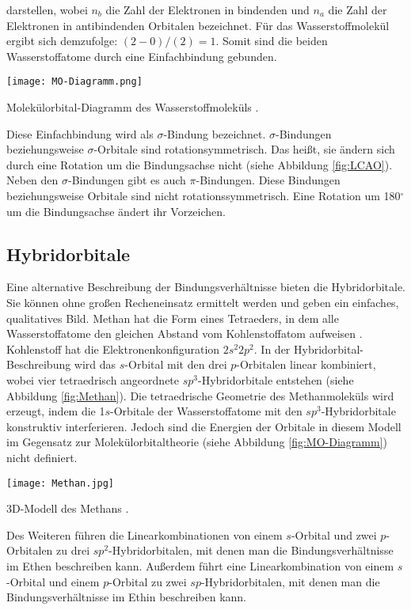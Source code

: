 darstellen, wobei $n_b$ die Zahl der Elektronen in bindenden und $n_a$ die Zahl der Elektronen in antibindenden Orbitalen bezeichnet. Für das Wasserstoffmolekül ergibt sich demzufolge: $(2-0)/(2) = 1$. Somit sind die beiden Wasserstoffatome durch eine Einfachbindung gebunden.

 \begin{dsafigure}
  \texttt{[image: MO-Diagramm.png]}
  \caption{Molekülorbital-Diagramm des Wasserstoffmoleküls \cite{WasserstoffMO}.}
  \label{fig:MO-Diagramm}
\end{dsafigure}

Diese Einfachbindung wird als $\sigma$-Bindung bezeichnet. $\sigma$-Bindungen beziehungsweise $\sigma$-Orbitale sind rotationsymmetrisch. Das heißt, sie ändern sich durch eine Rotation um die Bindungsachse nicht (siehe Abbildung \ref{fig:LCAO}). Neben den $\sigma$-Bindungen gibt es auch $\pi$-Bindungen. Diese Bindungen beziehungsweise Orbitale sind nicht rotationssymmetrisch. Eine Rotation um 180$^\circ$ um die Bindungsachse ändert ihr Vorzeichen.

\subsection{Hybridorbitale}

Eine alternative Beschreibung der Bindungsverhältnisse bieten die Hybridorbitale. Sie können ohne großen Recheneinsatz ermittelt werden und geben ein einfaches, qualitatives Bild.
Methan hat die Form eines Tetraeders, in dem alle Wasserstoffatome den gleichen Abstand vom Kohlenstoffatom aufweisen \cite{Riedel04}. Kohlenstoff hat die Elektronenkonfiguration $2s^2 2p^2$. In der Hybridorbital-Beschreibung wird das $s$-Orbital mit den drei $p$-Orbitalen linear kombiniert, wobei vier tetraedrisch angeordnete $sp^3$-Hybridorbitale entstehen (siehe Abbildung \ref{fig:Methan}).
Die tetraedrische Geometrie des Methanmoleküls wird erzeugt, indem die 1$s$-Orbitale der Wasserstoffatome mit den $sp^3$-Hybridorbitale konstruktiv interferieren. Jedoch sind die Energien der Orbitale in diesem Modell im Gegensatz zur Molekülorbitaltheorie (siehe Abbildung \ref{fig:MO-Diagramm}) nicht definiert. 



 \begin{dsafigure}
  \texttt{[image: Methan.jpg]}
  \caption{3D-Modell des Methans \cite{ADF2017authors}. }
  \label{fig:Methan}
\end{dsafigure}

Des Weiteren führen die Linearkombinationen von einem $s$-Orbital und zwei $p$-Orbitalen zu drei $sp^2$-Hybridorbitalen, mit denen man die Bindungsverhältnisse im Ethen beschreiben kann. Außerdem führt eine Linearkombination von einem $s$-Orbital und einem $p$-Orbital zu zwei $sp$-Hybridorbitalen, mit denen man die Bindungsverhältnisse im Ethin beschreiben kann.
